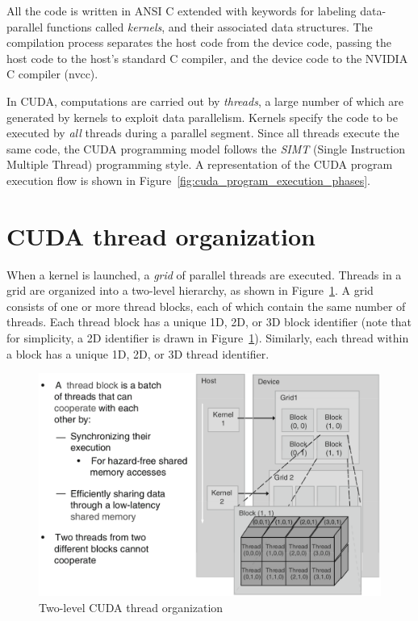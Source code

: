 \documentclass[12pt, a4paper]{report}
\begin{document}
\begin{sloppypar}
All the code is written in ANSI C extended with keywords for labeling data-
parallel functions called \emph{kernels}, and their associated data structures.
The compilation process separates the host code from the device code, passing
the host code to the host's standard C compiler, and the device code to the
NVIDIA C compiler (nvcc).

In CUDA, computations are carried out by \emph{threads}, a large number of which
are generated by kernels to exploit data parallelism.
Kernels specify the code to be executed by \emph{all} threads during a parallel
segment.
Since all threads execute the same code, the CUDA programming model follows the
\emph{SIMT} (Single Instruction Multiple Thread) programming style.
A representation of the CUDA program execution flow is shown in
Figure~\ref{fig:cuda_program_execution_phases}.

\section{CUDA thread organization}
\label{sec:cuda_thread_organization}
When a kernel is launched, a \emph{grid} of parallel threads are executed.
Threads in a grid are organized into a two-level hierarchy, as shown in
Figure~\ref{fig:cuda_thread_organization}.
A grid consists of one or more thread blocks, each of which contain the same
number of threads.
Each thread block has a unique 1D, 2D, or 3D block identifier (note that for
simplicity, a 2D identifier is drawn in
Figure~\ref{fig:cuda_thread_organization}).
Similarly, each thread within a block has a unique 1D, 2D, or 3D thread
identifier.

\begin{figure}[h]
\centering
\includegraphics[scale=0.27]{figs/cuda_thread_organization}
\caption{Two-level CUDA thread organization}
\label{fig:cuda_thread_organization}
\end{figure}


\end{sloppypar}
\end{document}
